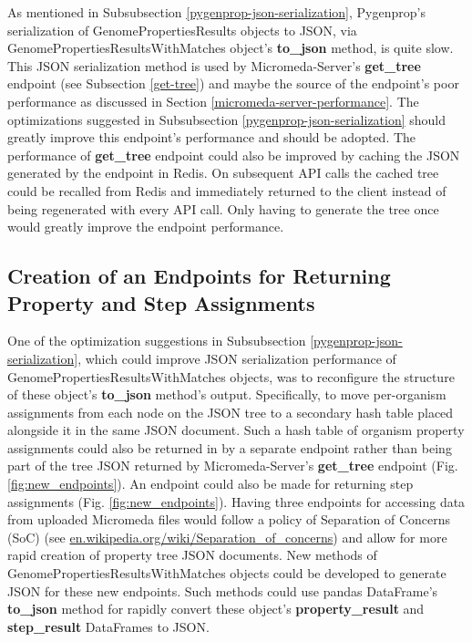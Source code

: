 As mentioned in Subsubsection \ref{pygenprop-json-serialization}, Pygenprop's serialization of GenomePropertiesResults objects to JSON, via GenomePropertiesResultsWithMatches object's \textbf{to\_json} method, is quite slow. This JSON serialization method is used by Micromeda-Server's \textbf{get\_tree} endpoint (see Subsection \ref{get-tree}) and maybe the source of the endpoint's poor performance as discussed in Section \ref{micromeda-server-performance}. The optimizations suggested in Subsubsection \ref{pygenprop-json-serialization} should greatly improve this endpoint's performance and should be adopted. The performance of \textbf{get\_tree} endpoint could also be improved by caching the JSON generated by the endpoint in Redis. On subsequent API calls the cached tree could be recalled from Redis and immediately returned to the client instead of being regenerated with every API call. Only having to generate the tree once would greatly improve the endpoint performance.

\subsection{Creation of an Endpoints for Returning Property and Step Assignments} \label{assignment-endpoints}

One of the optimization suggestions in Subsubsection \ref{pygenprop-json-serialization}, which could improve JSON serialization performance of GenomePropertiesResultsWithMatches objects, was to reconfigure the structure of these object's \textbf{to\_json} method's output. Specifically, to move per-organism assignments from each node on the JSON tree to a secondary hash table placed alongside it in the same JSON document. Such a hash table of organism property assignments could also be returned in by a separate endpoint rather than being part of the tree JSON returned by Micromeda-Server's \textbf{get\_tree} endpoint (Fig. \ref{fig:new_endpoints}). An endpoint could also be made for returning step assignments (Fig. \ref{fig:new_endpoints}). Having three endpoints for accessing data from uploaded Micromeda files would follow a policy of Separation of Concerns (SoC) (see \href{en.wikipedia.org/wiki/Separation\_of\_concerns}{en.wikipedia.org/wiki/Separation\_of\_concerns}) and allow for more rapid creation of property tree JSON documents. New methods of GenomePropertiesResultsWithMatches objects could be developed to generate JSON for these new endpoints. Such methods could use pandas DataFrame's \textbf{to\_json} method for rapidly convert these object's \textbf{property\_result} and \textbf{step\_result} DataFrames to JSON.

